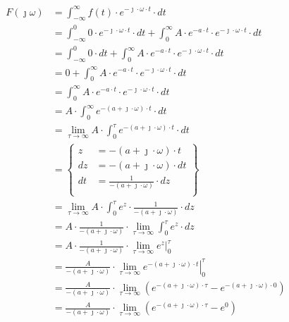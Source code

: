 \begin{task}
\begin{align*}
F(\jmath \omega )&=\int_{-\infty }^{\infty}f(t) \cdot e^{-\jmath \cdot \omega \cdot t}\cdot dt\\
&=\int_{-\infty}^{0} 0 \cdot e^{-\jmath \cdot \omega \cdot t}\cdot dt
+\int_{0}^{\infty} A \cdot e^{-a \cdot t} \cdot e^{-\jmath \cdot \omega \cdot t}\cdot dt\\
&=\int_{-\infty}^{0} 0 \cdot dt
+\int_{0}^{\infty} A \cdot e^{-a \cdot t} \cdot e^{-\jmath \cdot \omega \cdot t}\cdot dt\\
&=0 +\int_{0}^{\infty} A \cdot e^{-a \cdot t} \cdot e^{-\jmath \cdot \omega \cdot t}\cdot dt\\
&=\int_{0}^{\infty} A \cdot e^{-a \cdot t} \cdot e^{-\jmath \cdot \omega \cdot t}\cdot dt\\
&=A\cdot \int_{0}^{\infty} e^{-( a + \jmath \cdot \omega) \cdot t}\cdot dt\\
&=\lim_{\tau \rightarrow \infty} A\cdot \int_{0}^{\tau} e^{-( a + \jmath \cdot \omega) \cdot t}\cdot dt\\
&=\begin{Bmatrix}
z&=-( a + \jmath \cdot \omega) \cdot t\\
dz&=-( a + \jmath \cdot \omega) \cdot dt\\
dt&=\frac{1}{-( a + \jmath \cdot \omega)} \cdot dz\\
\end{Bmatrix}\\
&=\lim_{\tau \rightarrow \infty} A\cdot \int_{0}^{\tau} e^{z}\cdot \frac{1}{-( a + \jmath \cdot \omega)} \cdot dz\\
&=A\cdot \frac{1}{-( a + \jmath \cdot \omega)}\cdot \lim_{\tau \rightarrow \infty} \int_{0}^{\tau} e^{z} \cdot dz\\
&=A\cdot \frac{1}{-( a + \jmath \cdot \omega)}\cdot \lim_{\tau \rightarrow \infty} \left. e^{z} \right|_{0}^{\tau}\\
&=\frac{A}{-( a + \jmath \cdot \omega)}\cdot \lim_{\tau \rightarrow \infty} \left. e^{-( a + \jmath \cdot \omega) \cdot t} \right|_{0}^{\tau}\\
&=\frac{A}{-( a + \jmath \cdot \omega)} \cdot \lim_{\tau \rightarrow \infty} \left(e^{-( a + \jmath \cdot \omega) \cdot \tau} - e^{-( a + \jmath \cdot \omega) \cdot 0}\right)\\
&=\frac{A}{-( a + \jmath \cdot \omega)} \cdot \lim_{\tau \rightarrow \infty} \left(e^{-( a + \jmath \cdot \omega) \cdot \tau} - e^{0}\right)\\

\end{align*}
\end{task}
